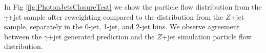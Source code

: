 In Fig \ref{fig:PhotonJetsClosureTest} we show the particle flow \met distribution 
from the $\gamma$+jet sample after reweighting compared to the \met distribution from the 
$Z$+jet sample, separately in the 0-jet, 1-jet, and 2-jet bins. We observe agreement between 
the $\gamma$+jet generated prediction and the $Z$+jet simulation particle flow \met distribution. 

\begin{figure}[!htbp]
\begin{center}

\end{center}
\end{figure}
